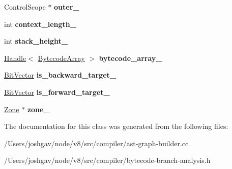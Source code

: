 \begin{DoxyCompactItemize}
\item 
Control\+Scope $\ast$ {\bfseries outer\+\_\+}\hypertarget{classv8_1_1internal_1_1compiler_1_1_b_a_s_e___e_m_b_e_d_d_e_d_a6397771170cadaa99473ba843db0c0e1}{}\label{classv8_1_1internal_1_1compiler_1_1_b_a_s_e___e_m_b_e_d_d_e_d_a6397771170cadaa99473ba843db0c0e1}

\item 
int {\bfseries context\+\_\+length\+\_\+}\hypertarget{classv8_1_1internal_1_1compiler_1_1_b_a_s_e___e_m_b_e_d_d_e_d_a720f886d25ed1c3fd18c5cb22060ab34}{}\label{classv8_1_1internal_1_1compiler_1_1_b_a_s_e___e_m_b_e_d_d_e_d_a720f886d25ed1c3fd18c5cb22060ab34}

\item 
int {\bfseries stack\+\_\+height\+\_\+}\hypertarget{classv8_1_1internal_1_1compiler_1_1_b_a_s_e___e_m_b_e_d_d_e_d_a9a857f3de8e5f121bf561240a2888c53}{}\label{classv8_1_1internal_1_1compiler_1_1_b_a_s_e___e_m_b_e_d_d_e_d_a9a857f3de8e5f121bf561240a2888c53}

\item 
\hyperlink{classv8_1_1internal_1_1_handle}{Handle}$<$ \hyperlink{classv8_1_1internal_1_1_bytecode_array}{Bytecode\+Array} $>$ {\bfseries bytecode\+\_\+array\+\_\+}\hypertarget{classv8_1_1internal_1_1compiler_1_1_b_a_s_e___e_m_b_e_d_d_e_d_a7225e9e743ab2a926091797fb8b5e04f}{}\label{classv8_1_1internal_1_1compiler_1_1_b_a_s_e___e_m_b_e_d_d_e_d_a7225e9e743ab2a926091797fb8b5e04f}

\item 
\hyperlink{classv8_1_1internal_1_1_bit_vector}{Bit\+Vector} {\bfseries is\+\_\+backward\+\_\+target\+\_\+}\hypertarget{classv8_1_1internal_1_1compiler_1_1_b_a_s_e___e_m_b_e_d_d_e_d_acfa28f09127a361f8f214612df6a59ba}{}\label{classv8_1_1internal_1_1compiler_1_1_b_a_s_e___e_m_b_e_d_d_e_d_acfa28f09127a361f8f214612df6a59ba}

\item 
\hyperlink{classv8_1_1internal_1_1_bit_vector}{Bit\+Vector} {\bfseries is\+\_\+forward\+\_\+target\+\_\+}\hypertarget{classv8_1_1internal_1_1compiler_1_1_b_a_s_e___e_m_b_e_d_d_e_d_adf2ce3b0f2fadab5c7bfc0d437f6c844}{}\label{classv8_1_1internal_1_1compiler_1_1_b_a_s_e___e_m_b_e_d_d_e_d_adf2ce3b0f2fadab5c7bfc0d437f6c844}

\item 
\hyperlink{classv8_1_1internal_1_1_zone}{Zone} $\ast$ {\bfseries zone\+\_\+}\hypertarget{classv8_1_1internal_1_1compiler_1_1_b_a_s_e___e_m_b_e_d_d_e_d_ae6fe27b0609824db6b3e6ab94ec9e810}{}\label{classv8_1_1internal_1_1compiler_1_1_b_a_s_e___e_m_b_e_d_d_e_d_ae6fe27b0609824db6b3e6ab94ec9e810}

\end{DoxyCompactItemize}


The documentation for this class was generated from the following files\+:\begin{DoxyCompactItemize}
\item 
/\+Users/joshgav/node/v8/src/compiler/ast-\/graph-\/builder.\+cc\item 
/\+Users/joshgav/node/v8/src/compiler/bytecode-\/branch-\/analysis.\+h\end{DoxyCompactItemize}
